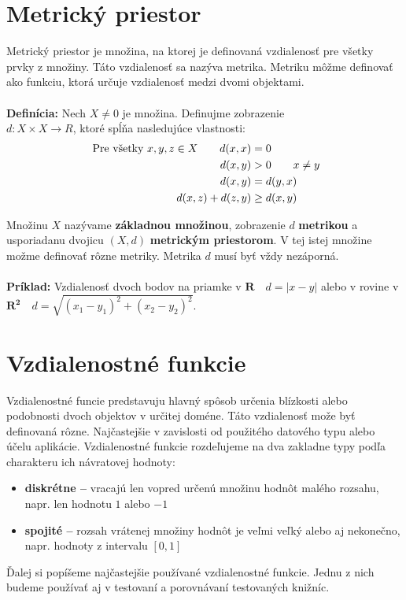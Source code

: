 \documentclass[12pt,oneside]{fithesis2}
\begin{document}
    \section{Metrický priestor}
    
    Metrický priestor je množina, na ktorej je definovaná vzdialenosť pre všetky prvky z množiny. Táto vzdialenosť sa nazýva metrika. Metriku môžme definovať ako funkciu, ktorá určuje vzdialenosť medzi dvomi objektami. \\ \\
    \textbf{Definícia:} Nech $X\neq 0$ je množina. Definujme zobrazenie \\ $d: X \times X \rightarrow R $, ktoré spĺňa nasledujúce vlastnosti:
    \begin{align*}
    \textrm{ Pre všetky } x,y,z \in X \qquad d(x,x) &= 0 \\
    d(x,y) &\textgreater 0 \qquad x\neq y \\
    d(x,y) &= d(y,x) \\
    d(x,z) + d(z,y) &\geq d(x,y)
    \end{align*}
    
    Množinu \textbf{$X$} nazývame \textbf{základnou množinou}, zobrazenie $d$ \textbf{metrikou} a usporiadanu dvojicu $(X,d)$ \textbf{metrickým priestorom}.
    V tej istej množine možme definovať rôzne metriky. Metrika $d$ musí byť vždy nezáporná. \cite{Yianilos:1993:DSA:313559.313789} \\ \\
    \textbf{Príklad:} 
    Vzdialenosť dvoch bodov na priamke v $ \mathbf{R} \quad d=|x-y| $ alebo v rovine v
     $\mathbf{R^2} \quad d = \sqrt{(x_1-y_1)^2+(x_2-y_2)^2}$.
    
	\section{Vzdialenostné funkcie}
	Vzdialenostné funcie predstavuju hlavný spôsob určenia blízkosti alebo podobnosti dvoch objektov v určitej doméne. Táto vzdialenosť može byť definovaná rôzne. Najčastejšie v zavislosti od použitého datového typu alebo účelu aplikácie.
	Vzdialenostné funkcie rozdeľujeme na dva zakladne typy podľa charakteru ich návratovej hodnoty:
	\begin{itemize}
	\item \textbf{diskrétne --} vracajú len vopred určenú množinu hodnôt malého rozsahu, napr. 	     len hodnotu $1$ alebo $-1$
	\item \textbf{spojité --} rozsah vrátenej množiny hodnôt je veľmi veľký alebo aj nekonečno, 		napr. hodnoty z intervalu $[0,1]$
	\end{itemize}
	Ďalej si popíšeme najčastejšie používané vzdialenostné funkcie. Jednu z nich budeme používať aj v testovaní a porovnávaní testovaných knižníc. \cite{Zezula2, Chavez:2001}
\end{document}
